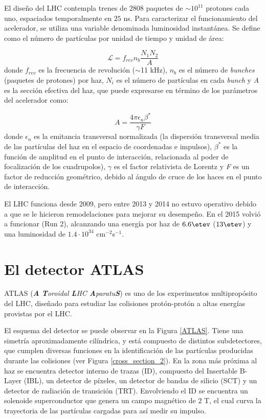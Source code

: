 El diseño del LHC contempla trenes de $2808$ paquetes de $\sim 10^{11}$ protones cada uno, espaciados temporalmente en $25$ ns. Para caracterizar el funcionamiento del acelerador, se utiliza una variable denominada luminosidad instantánea. Se define como el número de partículas por unidad de tiempo y unidad de área:

\begin{equation}
\mathcal{L}=f_{rev}n_{b}\frac{N_{1}N_{2}}{A}
\end{equation}
donde $f_{rev}$ es la frecuencia de revolución ($\sim$11 kHz), $n_{b}$ es el número de \textit{bunches} (paquetes de protones) por haz, $N_{i}$ es el número de partículas en cada \textit{bunch} y \textit{A} es la sección efectiva del haz, que puede expresarse en término de los parámetros del acelerador como:

\begin{equation}
A=\frac{4 \pi \epsilon_{n}\beta^{*}}{\gamma F}
\end{equation}
donde $\epsilon_{n}$ es la emitancia transversal normalizada (la dispersión transversal media de las partículas del  haz en el espacio de coordenadas e impulsos), $\beta^{*}$ es la función de amplitud en el punto de interacción, relacionada al poder de focalización de los cuadrupolos), $\gamma$ es el factor relativista de Lorentz y \textit{F} es un factor de reducción geométrico, debido al ángulo de cruce de los haces en el punto de interacción.


El LHC funciona desde 2009, pero entre 2013 y 2014 no estuvo operativo debido a que se le hicieron remodelaciones para mejorar su desempeño. En el 2015 volvió a funcionar (Run 2), alcanzando una energía por haz de $6.6 \etev$ ($13 \etev$) y una luminosidad de $1.4\cdot 10^{34}$ cm$^{-2}$s$^{-1}$.

\section{El detector ATLAS}

ATLAS (\textit{\textbf{A} \textbf{T}oroidal \textbf{L}HC \textbf{A}paratu\textbf{S}})  \cite{PERF-2007-01} es uno de los experimentos multipropósito del LHC, diseñado para estudiar las colisiones protón-protón a altas energías provistas por el LHC.

El esquema del detector se puede observar en la Figura \ref{ATLAS}. Tiene una simetría aproximadamente cilíndrica, y está compuesto de distintos subdetectores, que cumplen diversas funciones en la identificación de las partículas producidas durante las colisiones (ver Figura \ref{cross_section_2}). En la zona más próxima al haz se encuentra detector interno de trazas (ID), compuesto del Insertable B-Layer (IBL), un detector de píxeles, un detector de bandas de silicio (SCT) y un detector de radiación de transición (TRT). Envolviendo el ID se encuentra un solenoide superconductor que genera un campo magnético de $2$ T, el cual curva la trayectoria de las partículas cargadas para así medir su impulso.

